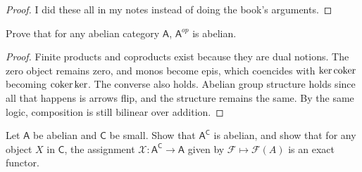 \documentclass[11pt]{report}
\begin{document}
\begin{proof}
	I did these all in my notes instead of doing the book's arguments.
\end{proof}
\begin{exercise}
	Prove that for any abelian category $\mathsf{A} $, $\mathsf{A}^{op} $ is abelian.
\end{exercise}
\begin{proof}
	Finite products and coproducts exist because they are dual notions. The zero object remains zero, and monos become epis, which coencides with $\ker \operatorname{coker} $ becoming $\operatorname{coker} \ker $. The converse also holds. Abelian group structure holds since all that happens is arrows flip, and the structure remains the same. By the same logic, composition is still bilinear over addition.
\end{proof}
\begin{exercise}
	Let $\mathsf{A} $ be abelian and $\mathsf{C} $ be small. Show that $\mathsf{A} ^{\mathsf{C} } $ is abelian, and show that for any object $X$ in $\mathsf{C} $, the assignment $\mathscr{X} : \mathsf{A} ^{\mathsf{C} }  \to \mathsf{A} $ given by $\mathscr{F} \mapsto \mathscr{F} (A)$ is an exact functor.
\end{exercise}
\end{document}
